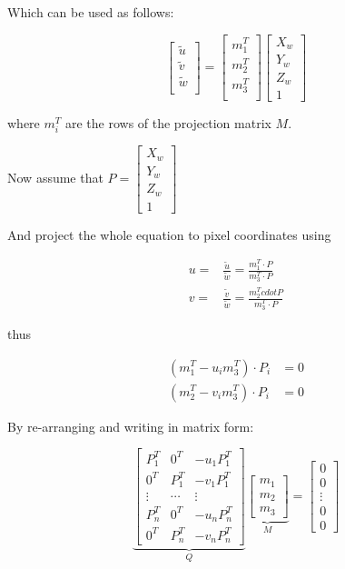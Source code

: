 \documentclass[10pt,a4paper]{scrartcl}
\begin{document}
\begin{multicols*}{2}
Which can be used as follows:

\begin{equation*}
\begin{bmatrix}
\tilde{u}\\
\tilde{v}\\
\tilde{w}\\
\end{bmatrix}=
\begin{bmatrix}
m_1^T\\
m_2^T\\
m_3^T\\
\end{bmatrix}
\begin{bmatrix}
X_w\\
Y_w\\
Z_w\\
1
\end{bmatrix}
\end{equation*}

where $m_i^T$ are the rows of the projection matrix $M$.

Now assume that $P=\begin{bmatrix}
X_w\\Y_w\\Z_w\\1
\end{bmatrix}$

And project the whole equation to pixel coordinates using

\begin{align*}
u=&\frac{\tilde{u}}{\tilde{w}}=\frac{m_1^T\cdot P}{m_3^T\cdot P}\\
v=&\frac{\tilde{v}}{\tilde{w}}=\frac{m_2^Tcdot P}{m_3^T\cdot P}
\end{align*}

thus

\begin{align*}
(m_1^T-u_im_3^T)\cdot P_i&=0\\
(m_2^T-v_im_3^T)\cdot P_i&=0
\end{align*}

By re-arranging and writing in matrix form:

\begin{equation*}
\underbrace{
\begin{bmatrix}
P_1^T&0^T&-u_1P_1^T\\
0^T&P_1^T&-v_1P_1^T\\
\vdots&\cdots&\vdots\\
P_n^T&0^T&-u_nP_n^T\\
0^T&P_n^T&-v_nP_n^T
\end{bmatrix}}_Q
\underbrace{\begin{bmatrix}
m_1\\m_2\\m_3
\end{bmatrix}}_M=
\begin{bmatrix}
0\\0\\\vdots\\0\\0
\end{bmatrix}
\end{equation*}


\end{multicols*}
\end{document}
